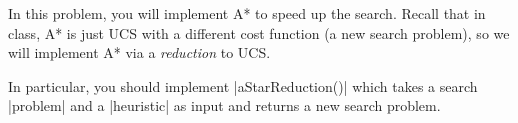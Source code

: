 \item {}

In this problem, you will implement A* to speed up the search. Recall that in class, A* is just UCS with a different cost function (a new search problem), so we will implement A* via a \textit{reduction} to UCS.

In particular, you should implement |aStarReduction()| which takes a search |problem| and a |heuristic| as input and returns a new search problem.

  